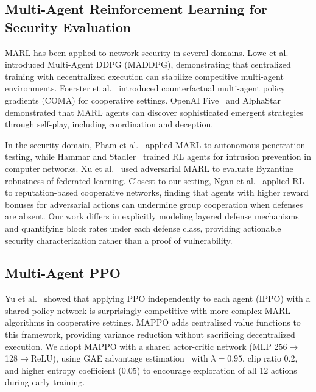\subsection{Multi-Agent Reinforcement Learning for Security Evaluation}

MARL has been applied to network security in several domains.
Lowe et al.~\cite{lowe2017multi} introduced Multi-Agent DDPG (MADDPG), demonstrating
that centralized training with decentralized execution can stabilize
competitive multi-agent environments.  Foerster et al.~\cite{foerster2018counterfactual}
introduced counterfactual multi-agent policy gradients (COMA) for cooperative
settings.  OpenAI Five~\cite{berner2019dota} and AlphaStar~\cite{vinyals2019grandmaster}
demonstrated that MARL agents can discover sophisticated emergent strategies
through self-play, including coordination and deception.

In the security domain, Pham et al.~\cite{pham2021deep} applied MARL to
autonomous penetration testing, while Hammar and Stadler~\cite{hammar2022learning}
trained RL agents for intrusion prevention in computer networks.  Xu et
al.~\cite{xu2020adversarial} used adversarial MARL to evaluate Byzantine
robustness of federated learning.  Closest to our setting, Ngan et
al.~\cite{ngan2020adversarial} applied RL to reputation-based cooperative
networks, finding that agents with higher reward bonuses for adversarial
actions can undermine group cooperation when defenses are absent.  Our work
differs in explicitly modeling layered defense mechanisms and quantifying
block rates under each defense class, providing actionable security
characterization rather than a proof of vulnerability.

\subsection{Multi-Agent PPO}

Yu et al.~\cite{yu2021surprising} showed that applying PPO independently to
each agent (IPPO) with a shared policy network is surprisingly competitive
with more complex MARL algorithms in cooperative settings.  MAPPO adds
centralized value functions to this framework, providing variance reduction
without sacrificing decentralized execution.  We adopt MAPPO with a shared
actor-critic network (MLP 256$\to$128$\to$ReLU), using GAE advantage
estimation~\cite{schulman2015high} with $\lambda=0.95$, clip ratio $0.2$,
and higher entropy coefficient ($0.05$) to encourage exploration of all 12
actions during early training.

